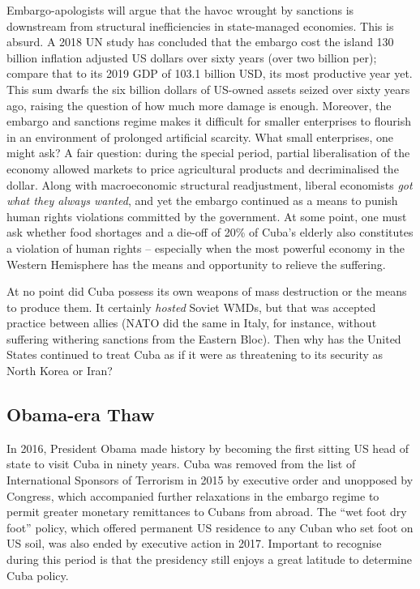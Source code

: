 \documentclass[letterpaper,12pt,twoside]{article} %
\begin{document}
\begin{multicols}{2}
Embargo-apologists will argue that the havoc wrought by sanctions is downstream from structural inefficiencies in state-managed economies. This is absurd. A 2018 UN study has concluded that the embargo cost the island 130 billion inflation adjusted US dollars over sixty years (over two billion per); compare that to its 2019 GDP of 103.1 billion USD, its most productive year yet.\autocite{worldbankcuba} This sum dwarfs the six billion dollars of US-owned assets seized over sixty years ago, raising the question of how much more damage is enough. Moreover, the embargo and sanctions regime makes it difficult for smaller enterprises to flourish in an environment of prolonged artificial scarcity. What small enterprises, one might ask? A fair question: during the special period, partial liberalisation of the economy allowed markets to price agricultural products and decriminalised the dollar. Along with macroeconomic structural readjustment, liberal economists \textit{got what they always wanted}, and yet the embargo continued as a means to punish human rights violations committed by the government. At some point, one must ask whether food shortages and a die-off of 20\% of Cuba's elderly\autocite[1379]{perez2009cuban} also constitutes a violation of human rights -- especially when the most powerful economy in the Western Hemisphere has the means and opportunity to relieve the suffering.

At no point did Cuba possess its own weapons of mass destruction or the means to produce them. It certainly \textit{hosted} Soviet WMDs, but that was accepted practice between allies (NATO did the same in Italy, for instance, without suffering withering sanctions from the Eastern Bloc). Then why has the United States continued to treat Cuba as if it were as threatening to its security as North Korea or Iran?

\subsection*{Obama-era Thaw}

In 2016, President Obama made history by becoming the first sitting US head of state to visit Cuba in ninety years. Cuba was removed from the list of International Sponsors of Terrorism in 2015 by executive order and unopposed by Congress, which accompanied further relaxations in the embargo regime to permit greater monetary remittances to Cubans from abroad. The ``wet foot dry foot'' policy, which offered permanent US residence to any Cuban who set foot on US soil, was also ended by executive action in 2017. Important to recognise during this period is that the presidency still enjoys a great latitude to determine Cuba policy.


\end{multicols}
\end{document}
